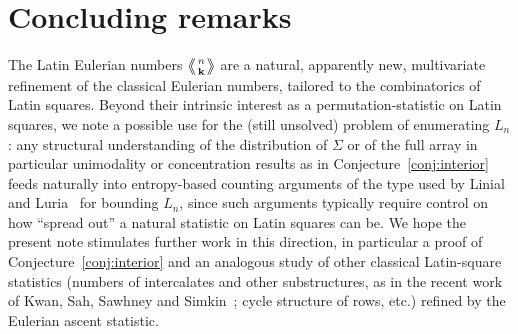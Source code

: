 \documentclass[11pt]{amsart}
\newcommand{\LE}[1]{\left\langle\!\!\left\langle #1 \right\rangle\!\!\right\rangle}
\begin{document}
\section{Concluding remarks}

The Latin Eulerian numbers $\LE{n\atop\mathbf k}$ are a natural, apparently new, multivariate refinement of the classical Eulerian numbers, tailored to the combinatorics of Latin squares. Beyond their intrinsic interest as a permutation-statistic on Latin squares, we note a possible use for the (still unsolved) problem of enumerating $L_n$: any structural understanding of the distribution of $\Sigma$ or of the full array in particular unimodality or concentration results as in Conjecture~\ref{conj:interior} feeds naturally into entropy-based counting arguments of the type used by Linial and Luria~\cite{LinialLuria} for bounding $L_n$, since such arguments typically require control on how ``spread out'' a natural statistic on Latin squares can be. We hope the present note stimulates further work in this direction, in particular a proof of Conjecture~\ref{conj:interior} and an analogous study of other classical Latin-square statistics (numbers of intercalates and other substructures, as in the recent work of Kwan, Sah, Sawhney and Simkin~\cite{KwanSahSawhneySimkin}; cycle structure of rows, etc.) refined by the Eulerian ascent statistic.
\end{document}
